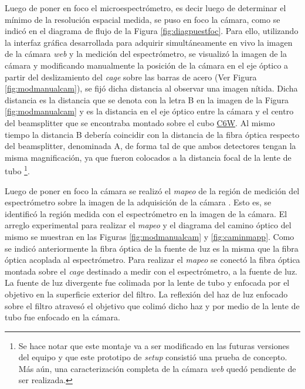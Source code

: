 \hspace{0.5cm}Luego de poner en foco el microespectrómetro, es decir luego de determinar el mínimo de la resolución espacial medida, se puso en foco la cámara, como se indicó en el diagrama de flujo de la Figura \ref{fig:diagpuestfoc}. Para ello, utilizando la interfaz gráfica desarrollada para adquirir simultáneamente en vivo la imagen de la cámara \textit{web} y la medición del espectrómetro, se visualizó la imagen de la cámara y modificando manualmente la posición de la cámara en el eje óptico a partir del deslizamiento del \textit{cage} sobre las barras de acero (Ver Figura \ref{fig:modmanualcam}), se fijó dicha distancia al observar una imagen nítida. Dicha distancia es la distancia que se denota con la letra B en la imagen de  la Figura \ref{fig:modmanualcam} y es la distancia en el eje óptico entre la cámara y el centro del beamsplitter que se encontraba montado sobre el cubo \href{https://www.thorlabs.com/thorproduct.cfm?partnumber=C6W}{C6W}. Al mismo tiempo la distancia B debería coincidir con la distancia de la fibra óptica respecto del beamsplitter, denominada A, de forma tal de que ambos detectores tengan la misma magnificación, ya que fueron colocados a la distancia focal de la lente de tubo \footnote{Se hace notar que este montaje va a ser modificado en las futuras versiones del equipo y que este prototipo de \textit{setup} consistió una prueba de concepto. Más aún, una caracterización completa de la cámara \textit{web} quedó pendiente de ser realizada.}.  

Luego de poner en foco la cámara se realizó el \textit{mapeo} de la región de medición del espectrómetro sobre la imagen de la adquisición de la cámara \cite{frise}. Esto es, se identificó la región medida con el espectrómetro en la imagen de la cámara. El arreglo experimental para realizar el \textit{mapeo} y el diagrama del camino óptico del mismo se muestran en las Figuras \ref{fig:modmanualcam} y \ref{fig:caminmapp}. Como se indicó anteriormente la fibra óptica de la fuente de luz es la misma que la fibra óptica acoplada al espectrómetro. Para realizar el \textit{mapeo} se conectó la fibra óptica montada sobre el \textit{cage} destinado a medir con el espectrómetro, a la fuente de luz. La fuente de luz divergente fue colimada por la lente de tubo y enfocada por el objetivo en la superficie exterior del filtro. La reflexión del haz de luz enfocado sobre el filtro atravesó el objetivo que colimó dicho haz y por medio de la lente de tubo fue enfocado en la cámara.


